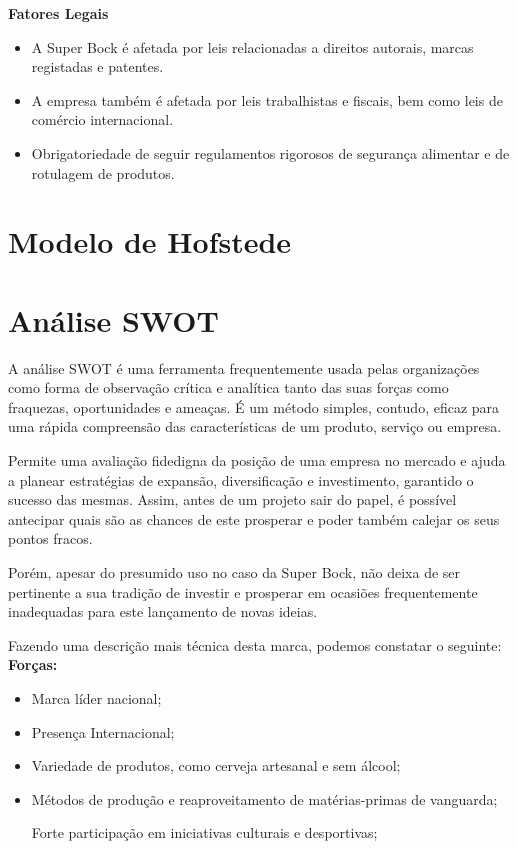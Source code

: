 \noindent \textbf{Fatores Legais} %
\begin{itemize}
    \item A Super Bock é afetada por leis relacionadas a direitos autorais, marcas registadas e patentes.
    \item A empresa também é afetada por leis trabalhistas e fiscais, bem como leis de comércio internacional.
    \item Obrigatoriedade de seguir regulamentos rigorosos de segurança alimentar e de rotulagem de produtos.
\end{itemize}

\section{Modelo de Hofstede}


\section{Análise SWOT}

A análise SWOT é uma ferramenta frequentemente usada pelas organizações como forma de observação crítica e analítica tanto das suas forças como fraquezas, oportunidades e ameaças. É um método simples, contudo, eficaz para uma rápida compreensão das características de um produto, serviço ou empresa. 

Permite uma avaliação fidedigna da posição de uma empresa no mercado e ajuda a planear estratégias de expansão, diversificação e investimento, garantido o sucesso das mesmas. Assim, antes de um projeto sair do papel, é possível antecipar quais são as chances de este prosperar e poder também calejar os seus pontos fracos. 

Porém, apesar do presumido uso no caso da Super Bock, não deixa de ser pertinente a sua tradição de investir e prosperar em ocasiões frequentemente inadequadas para este lançamento de novas ideias. 

Fazendo uma descrição mais técnica desta marca, podemos constatar o seguinte:\\

\noindent \textbf{Forças:}
\begin{itemize}
    
    \item Marca líder nacional; 

    \item Presença Internacional; 

    \item Variedade de produtos, como cerveja artesanal e sem álcool; 

    \item Métodos de produção e reaproveitamento de matérias-primas de vanguarda; 

Forte participação em iniciativas culturais e desportivas; 
\end{itemize}

